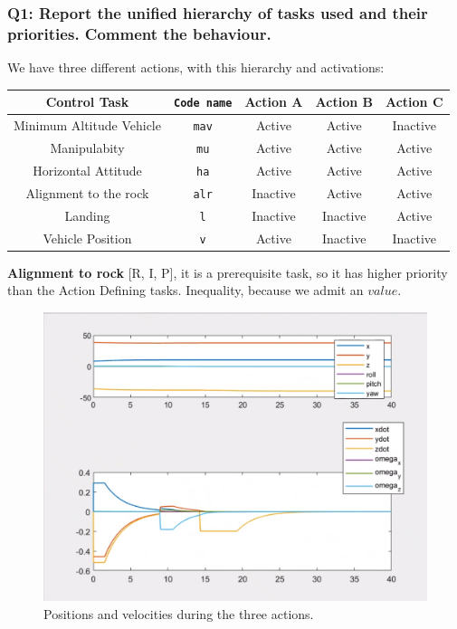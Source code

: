 \documentclass{article}
\newcommand{\ocio} {\marginpar{!}}
\begin{document}
\subsubsection{Q1: Report the unified hierarchy of tasks used and their priorities. Comment the behaviour.}
We have three different actions, with this hierarchy and activations:
\begin{center}
\begin{tabular}{ | c | c | c | c | c |}
\hline
 Control Task & \texttt{Code name} & Action A & Action B & Action C\\
 \hline
 Minimum Altitude Vehicle &  \texttt{mav} & Active & Active & Inactive\\  
 Manipulabity &  \texttt{mu} & Active & Active & Active\\
 Horizontal Attitude &  \texttt{ha} & Active & Active & Active\\
 Alignment to the rock & \texttt{alr} & Inactive & Active & Active \\
 Landing & \texttt{l} &Inactive & Inactive & Active \\
 Vehicle Position &  \texttt{v} &Active & Inactive & Inactive\\
 \hline
\end{tabular}
\end{center}
\begin{description}
\item \textbf{Alignment to rock} [R, I, P], it is a prerequisite task, so it has higher priority than the Action Defining tasks. Inequality, because we admit an $value$.  \ocio 
\end{description}

\begin{figure}[h]
    \centering
    \includegraphics[scale=0.3]{311_ppdot.png}
    \caption{Positions and velocities during the three actions.}
    \label{graphes3}
\end{figure}
\end{document}
